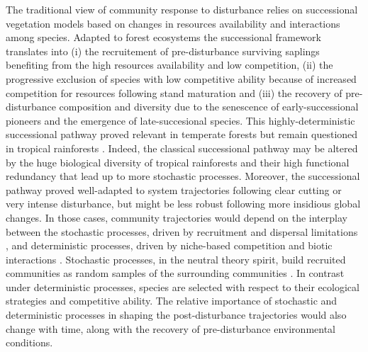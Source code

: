 \documentclass[fleqn,10pt]{ArtEcoFoG} %
\begin{document}
The traditional view of community response to disturbance relies on
successional vegetation models \citep{Clements1916} based on changes in
resources availability and interactions among species. Adapted to forest
ecosystems the successional framework translates into
\citep{Denslow2000} (i) the recruitement of pre-disturbance surviving
saplings benefiting from the high resources availability and low
competition, (ii) the progressive exclusion of species with low
competitive ability because of increased competition for resources
following stand maturation and (iii) the recovery of pre-disturbance
composition and diversity due to the senescence of early-successional
pioneers and the emergence of late-succesional species. This
highly-deterministic successional pathway proved relevant in temperate
forests but remain questioned in tropical rainforests
\citep{Norden2015}. Indeed, the classical successional pathway may be
altered by the huge biological diversity of tropical rainforests and
their high functional redundancy that lead up to more stochastic
processes. Moreover, the successional pathway proved well-adapted to
system trajectories following clear cutting or very intense disturbance,
but might be less robust following more insidious global changes. In
those cases, community trajectories would depend on the interplay
between the stochastic processes, driven by recruitment and dispersal
limitations \citep{Hubbell2001}, and deterministic processes, driven by
niche-based competition and biotic interactions \citep{Adler2007}.
Stochastic processes, in the neutral theory spirit, build recruited
communities as random samples of the surrounding communities
\citep{Hubbell2001, Chave2004}. In contrast under deterministic
processes, species are selected with respect to their ecological
strategies and competitive ability. The relative importance of
stochastic and deterministic processes in shaping the post-disturbance
trajectories would also change with time, along with the recovery of
pre-disturbance environmental conditions.
\end{document}

